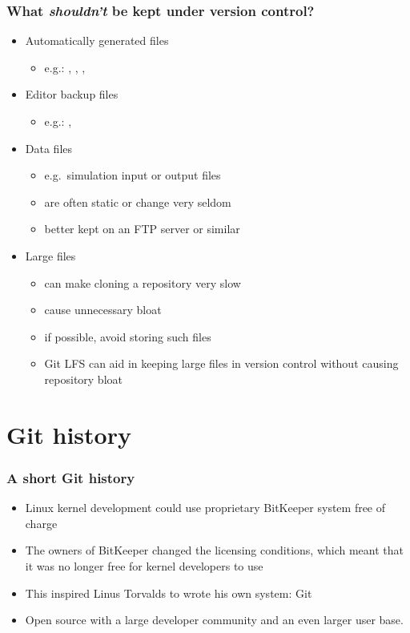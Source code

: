 \documentclass{git_course}
\begin{document}
\begin{frame}
\frametitle{What \emph{shouldn't} be kept under version control?}
\begin{itemize}
    \item Automatically generated files
        \begin{itemize}
            \item e.g.: , , , 
        \end{itemize}
    \item Editor backup files
        \begin{itemize}
            \item e.g.: , 
        \end{itemize}
    \item Data files
        \begin{itemize}
            \item e.g.\ simulation input or output files
            \item are often static or change very seldom
            \item better kept on an FTP server or similar
        \end{itemize}
    \item Large files
        \begin{itemize}
            \item can make cloning a repository very slow
            \item cause unnecessary bloat
            \item if possible, avoid storing such files
            \item Git LFS can aid in keeping large files in version
                control without causing repository bloat
        \end{itemize}
\end{itemize}
\end{frame}

\section{Git history}

\begin{frame}
\frametitle{A short Git history}
\begin{itemize}
    \item Linux kernel development could use proprietary BitKeeper system
        free of charge
    \item The owners of BitKeeper changed the licensing conditions, which
        meant that it was no longer free for kernel developers to use
    \item This inspired Linus Torvalds to wrote his own system: Git
    \item Open source with a large developer community and an even larger
        user base.
\end{itemize}
\end{frame}
\end{document}
